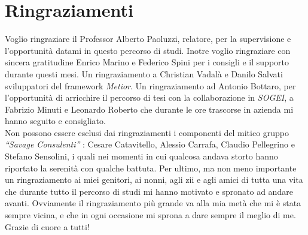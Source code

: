 \chapter{Ringraziamenti}
\label{cha:acknowledgements}

Voglio ringraziare il Professor Alberto Paoluzzi, relatore, per la supervisione e l'opportunità datami in questo percorso di studi.
Inotre voglio ringraziare con sincera gratitudine Enrico Marino e Federico Spini per i consigli e il supporto durante questi mesi.
Un ringraziamento a Christian Vadalà e Danilo Salvati sviluppatori del framework \emph{Metior}.
Un ringraziamento ad Antonio Bottaro, per l'opportunità di arricchire il percorso di tesi con la collaborazione in \emph{SOGEI},
a Fabrizio Minuti e Leonardo Roberto che durante le ore trascorse in azienda mi hanno seguito e consigliato.\\
Non possono essere esclusi dai ringraziamenti i componenti del mitico gruppo \emph{``Savage Consulenti''} :
Cesare Catavitello, Alessio Carrafa, Claudio Pellegrino e Stefano Sensolini, i quali nei momenti in cui qualcosa andava
storto hanno riportato la serenità con qualche battuta.
Per ultimo, ma non meno importante un ringraziamento ai miei genitori, ai nonni, agli zii e agli amici di tutta una vita
che durante tutto il percorso di studi mi hanno motivato e spronato ad andare avanti.
Ovviamente il ringraziamento più grande va alla mia metà che mi è stata sempre vicina, e che in ogni occasione mi sprona
a dare sempre il meglio di me. Grazie di cuore a tutti!
